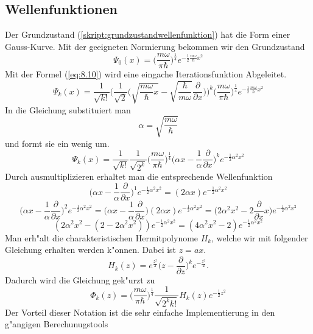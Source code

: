 \begin{refsection}
\subsection{Wellenfunktionen}
Der Grundzustand (\ref{skript:grundzustandwellenfunktion}) hat die Form einer Gauss-Kurve. Mit der geeigneten Normierung bekommen wir den Grundzustand
\[
\Psi_0(x)
=
\biggl(\frac{m\omega}{\pi\hbar}\biggr)^\frac14
e^{-\frac12\frac{m\omega}{\hbar}x^2}
\]
Mit der Formel (\ref{eq:8.10}) wird eine eingache Iterationsfunktion Abgeleitet.
\[
\Psi_k(x)
=
\frac1{\sqrt{k!}}\biggl(\frac1{\sqrt{2}}
\biggl(\sqrt{\frac{m\omega}{\hbar}x}-
\sqrt{\frac{\hbar}{m\omega}}\frac{\partial}{\partial x}\biggr)\biggr)^k
\biggl(\frac{m\omega}{\pi\hbar}\biggr)^\frac14
e^{-\frac12\frac{m\omega}{\hbar}x^2}
\]
In die Gleichung substituiert man
\[
\alpha=\sqrt{\frac{m\omega}\hbar}
\]
und formt sie ein wenig um.
\[
\Psi_k(x)
=
\frac1{\sqrt{k!}}\frac1{\sqrt{2^k}}
\biggl(\frac{m\omega}{\pi\hbar}\biggr)^\frac14
\biggl(\alpha x-\frac1{\alpha}\frac{\partial}{\partial x}\biggr)^k
e^{-\frac12\alpha^2x^2}
\]
Durch ausmultiplizieren erhaltet man die entsprechende Wellenfunktion
\[
\biggl(\alpha x-\frac1{\alpha}\frac{\partial}{\partial x}\biggr)^1
e^{-\frac12\alpha^2x^2}
=
(2\alpha x)e^{-\frac12\alpha^2x^2}
\]
\[
\biggl(\alpha x-\frac1{\alpha}\frac{\partial}{\partial x}\biggr)^2
e^{-\frac12\alpha^2x^2}
=
\biggl(\alpha x-\frac1{\alpha}\frac{\partial}{\partial x}\biggr)
(2\alpha x)e^{-\frac12\alpha^2x^2}
=
\biggl(2\alpha^2 x^2-2\frac{\partial}{\partial x}x\biggr)
e^{-\frac12\alpha^2x^2}
\]
\[
(2\alpha^2x^2-(2-2\alpha^2x^2))e^{-\frac12\alpha^2x^2}
=
(4\alpha^2x^2-2)e^{-\frac12\alpha^2x^2}
\]
Man erh"alt die charakteristischen Hermitpolynome $H_k$, welche wir mit folgender Gleichung erhalten werden k"onnen. Dabei ist $z=ax$.
\[
H_k(z)
=
e^{\frac{z^2}2}\biggl(z-\frac{\partial}{\partial z}\biggr)^k
e^{-\frac{z^2}2}.
\]
Dadurch wird die Gleichung gek"urzt zu
\[
\Phi_k(z)
=
\biggl(\frac{m\omega}{\pi\hbar}\biggr)^\frac14
\frac1{\sqrt{2^k k!}}H_k(z)
e^{-\frac12 z^2}
\]
Der Vorteil dieser Notation ist die sehr einfache Implementierung in den g"angigen Berechunugstools


\end{refsection}
